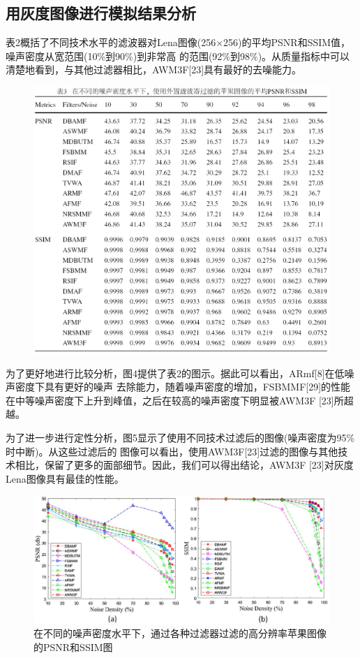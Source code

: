 \documentclass[12pt]{article} %
\begin{document}
\subsection{用灰度图像进行模拟结果分析}
表2概括了不同技术水平的滤波器对Lena图像(256×256)的平均PSNR和SSIM值，噪声密度从宽范围(10\%到90\%)到非常高
的范围(92\%到98\%)。从质量指标中可以清楚地看到，与其他过滤器相比，AWM3F[23]具有最好的去噪能力。

\begin{figure}[H]
    \centering
    \includegraphics[width=1\textwidth]{images/07.eps}    
\end{figure}

\hspace{2em}为了更好地进行比较分析，图4提供了表2的图示。据此可以看出，ARmf[8]在低噪声密度下具有更好的噪声
去除能力，随着噪声密度的增加，FSBMMF[29]的性能在中等噪声密度下上升到峰值，之后在较高的噪声密度下明显被AWM3F
[23]所超越。

\hspace{2em}为了进一步进行定性分析，图5显示了使用不同技术过滤后的图像(噪声密度为95\%时中断)。从这些过滤后的
图像可以看出，使用AWM3F[23]过滤的图像与其他技术相比，保留了更多的面部细节。因此，我们可以得出结论，AWM3F
[23]对灰度Lena图像具有最佳的性能。

\begin{figure}[H]
    \centering
    \includegraphics[width=1\textwidth]{images/08.eps}
    \caption{在不同的噪声密度水平下，通过各种过滤器过滤的高分辨率苹果图像的PSNR和SSIM图}
\end{figure}
\end{document}
